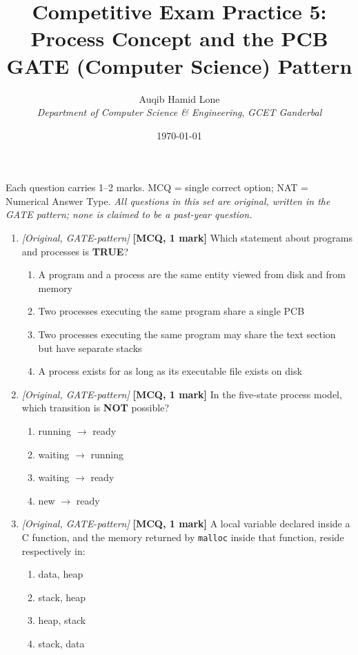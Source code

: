 \documentclass[11pt]{article}
\title{Competitive Exam Practice 5: Process Concept and the PCB\\\large GATE (Computer Science) Pattern}
\author{Auqib Hamid Lone\\[0.3em]
  \emph{Department of Computer Science \& Engineering}, \emph{GCET Ganderbal}}
\date{\today}
\begin{document}
\maketitle

\noindent Each question carries 1--2 marks. MCQ = single correct option; NAT = Numerical Answer Type. \emph{All questions in this set are original, written in the GATE pattern; none is claimed to be a past-year question.}

\begin{enumerate}
\item[\textbf{Q1}] \textit{[Original, GATE-pattern]} \textbf{[MCQ, 1 mark]} Which statement about programs and processes is \textbf{TRUE}?
\begin{enumerate}
  \item[(A)] A program and a process are the same entity viewed from disk and from memory
  \item[(B)] Two processes executing the same program share a single PCB
  \item[(C)] Two processes executing the same program may share the text section but have separate stacks
  \item[(D)] A process exists for as long as its executable file exists on disk
\end{enumerate}

\item[\textbf{Q2}] \textit{[Original, GATE-pattern]} \textbf{[MCQ, 1 mark]} In the five-state process model, which transition is \textbf{NOT} possible?
\begin{enumerate}
  \item[(A)] running $\to$ ready
  \item[(B)] waiting $\to$ running
  \item[(C)] waiting $\to$ ready
  \item[(D)] new $\to$ ready
\end{enumerate}

\item[\textbf{Q3}] \textit{[Original, GATE-pattern]} \textbf{[MCQ, 1 mark]} A local variable declared inside a C function, and the memory returned by \texttt{malloc} inside that function, reside respectively in:
\begin{enumerate}
  \item[(A)] data, heap
  \item[(B)] stack, heap
  \item[(C)] heap, stack
  \item[(D)] stack, data
\end{enumerate}


\end{enumerate}
\end{document}

